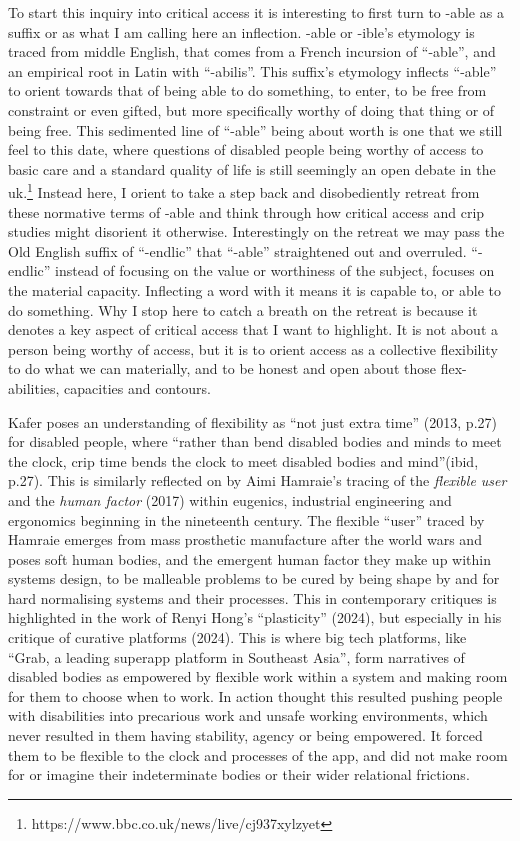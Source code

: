 To start this inquiry into critical access it is interesting to first
turn to -able as a suffix or as what I am calling here an inflection.
-able or -ible's etymology is traced from middle English, that comes
from a French incursion of ``-able'', and an empirical root in Latin
with ``-abilis''. This suffix's etymology inflects ``-able'' to orient
towards that of being able to do something, to enter, to be free from
constraint or even gifted, but more specifically worthy of doing that
thing or of being free. This sedimented line of ``-able'' being about
worth is one that we still feel to this date, where questions of
disabled people being worthy of access to basic care and a standard
quality of life is still seemingly an open debate in the uk.\footnote{https://www.bbc.co.uk/news/live/cj937xylzyet}
Instead here, I orient to take a step back and disobediently retreat
from these normative terms of -able and think through how critical
access and crip studies might disorient it otherwise. Interestingly on
the retreat we may pass the Old English suffix of ``-endlic'' that
``-able'' straightened out and overruled. ``-endlic'' instead of
focusing on the value or worthiness of the subject, focuses on the
material capacity. Inflecting a word with it means it is capable to, or
able to do something. Why I stop here to catch a breath on the retreat
is because it denotes a key aspect of critical access that I want to
highlight. It is not about a person being worthy of access, but it is to
orient access as a collective flexibility to do what we can materially,
and to be honest and open about those flex-abilities, capacities and
contours.

Kafer poses an understanding of flexibility as ``not just extra time''
(2013, p.27) for disabled people, where ``rather than bend disabled
bodies and minds to meet the clock, crip time bends the clock to meet
disabled bodies and mind''(ibid, p.27). This is similarly reflected on
by Aimi Hamraie's tracing of the \emph{flexible user} and the
\emph{human factor} (2017) within eugenics, industrial engineering and
ergonomics beginning in the nineteenth century. The flexible ``user''
traced by Hamraie emerges from mass prosthetic manufacture after the
world wars and poses soft human bodies, and the emergent human factor
they make up within systems design, to be malleable problems to be cured
by being shape by and for hard normalising systems and their processes.
This in contemporary critiques is highlighted in the work of Renyi
Hong's ``plasticity'' (2024), but especially in his critique of curative
platforms (2024). This is where big tech platforms, like ``Grab, a
leading superapp platform in Southeast Asia'', form narratives of
disabled bodies as empowered by flexible work within a system and making
room for them to choose when to work. In action thought this resulted
pushing people with disabilities into precarious work and unsafe working
environments, which never resulted in them having stability, agency or
being empowered. It forced them to be flexible to the clock and
processes of the app, and did not make room for or imagine their
indeterminate bodies or their wider relational frictions.

